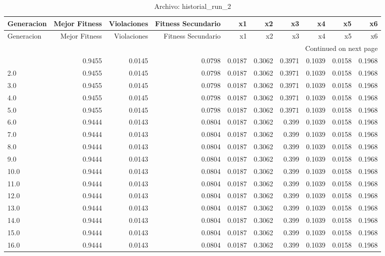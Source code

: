 \begin{longtable}{lrrrrrrrrr}
\caption{Archivo: historial\_run\_2}\label{tab:historial_run_2} \\
\toprule
Generacion & Mejor Fitness & Violaciones & Fitness Secundario & x1 & x2 & x3 & x4 & x5 & x6 \\
\midrule
\endfirsthead
\toprule
Generacion & Mejor Fitness & Violaciones & Fitness Secundario & x1 & x2 & x3 & x4 & x5 & x6 \\
\midrule
\endhead
\midrule
\multicolumn{10}{r}{Continued on next page} \\
\midrule
\endfoot
\bottomrule
\endlastfoot
1.0 & 0.9455 & 0.0145 & 0.0798 & 0.0187 & 0.3062 & 0.3971 & 0.1039 & 0.0158 & 0.1968 \\
2.0 & 0.9455 & 0.0145 & 0.0798 & 0.0187 & 0.3062 & 0.3971 & 0.1039 & 0.0158 & 0.1968 \\
3.0 & 0.9455 & 0.0145 & 0.0798 & 0.0187 & 0.3062 & 0.3971 & 0.1039 & 0.0158 & 0.1968 \\
4.0 & 0.9455 & 0.0145 & 0.0798 & 0.0187 & 0.3062 & 0.3971 & 0.1039 & 0.0158 & 0.1968 \\
5.0 & 0.9455 & 0.0145 & 0.0798 & 0.0187 & 0.3062 & 0.3971 & 0.1039 & 0.0158 & 0.1968 \\
6.0 & 0.9444 & 0.0143 & 0.0804 & 0.0187 & 0.3062 & 0.399 & 0.1039 & 0.0158 & 0.1968 \\
7.0 & 0.9444 & 0.0143 & 0.0804 & 0.0187 & 0.3062 & 0.399 & 0.1039 & 0.0158 & 0.1968 \\
8.0 & 0.9444 & 0.0143 & 0.0804 & 0.0187 & 0.3062 & 0.399 & 0.1039 & 0.0158 & 0.1968 \\
9.0 & 0.9444 & 0.0143 & 0.0804 & 0.0187 & 0.3062 & 0.399 & 0.1039 & 0.0158 & 0.1968 \\
10.0 & 0.9444 & 0.0143 & 0.0804 & 0.0187 & 0.3062 & 0.399 & 0.1039 & 0.0158 & 0.1968 \\
11.0 & 0.9444 & 0.0143 & 0.0804 & 0.0187 & 0.3062 & 0.399 & 0.1039 & 0.0158 & 0.1968 \\
12.0 & 0.9444 & 0.0143 & 0.0804 & 0.0187 & 0.3062 & 0.399 & 0.1039 & 0.0158 & 0.1968 \\
13.0 & 0.9444 & 0.0143 & 0.0804 & 0.0187 & 0.3062 & 0.399 & 0.1039 & 0.0158 & 0.1968 \\
14.0 & 0.9444 & 0.0143 & 0.0804 & 0.0187 & 0.3062 & 0.399 & 0.1039 & 0.0158 & 0.1968 \\
15.0 & 0.9444 & 0.0143 & 0.0804 & 0.0187 & 0.3062 & 0.399 & 0.1039 & 0.0158 & 0.1968 \\
16.0 & 0.9444 & 0.0143 & 0.0804 & 0.0187 & 0.3062 & 0.399 & 0.1039 & 0.0158 & 0.1968 \\

\end{longtable}
